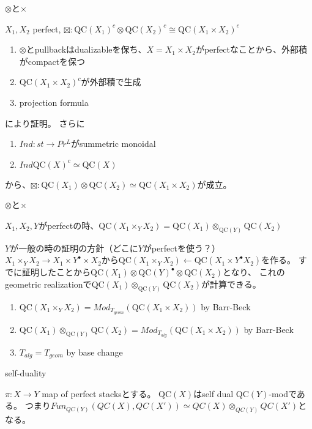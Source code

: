 \documentclass[dvipdfmx]{beamer}
\newcommand{\QC}{\mathrm{QC}}
\begin{document}
\begin{frame}{$\otimes$と$\times$}
\begin{prop}
$X_1, X_2$ perfect, $\boxtimes:\QC(X_1)^c\otimes \QC(X_2)^c \cong \QC(X_1\times X_2)^c$
\end{prop}
\begin{enumerate}
\item $\otimes$とpullbackはdualizableを保ち、$X=X_1\times X_2$がperfectなことから、外部積がcompactを保つ
\item $\QC(X_1\times X_2)^c$が外部積で生成
\item projection formula
\end{enumerate}
により証明。
さらに
\begin{enumerate}
\item $Ind:st \to Pr^L$がsummetric monoidal
\item $Ind\QC(X)^c\simeq \QC(X)$
\end{enumerate}
から、$\boxtimes:\QC(X_1)\otimes \QC(X_2) \simeq \QC(X_1\times X_2)$が成立。
\end{frame}

\begin{frame}{$\otimes$と$\times$}
\begin{thm}[BFNのTheorem 4.7]
$X_1, X_2, Y$がperfectの時、$\QC(X_1 \times_Y X_2) = \QC(X_1) \otimes_{\QC(Y)}\QC(X_2)$
\end{thm}

$Y$が一般の時の証明の方針（どこに$Y$がperfectを使う？）
$X_1\times_YX_2 \to X_1\times Y^\bullet\times X_2$から$\QC(X_1\times_YX_2) \gets \QC(X_1\times Y^\bullet X_2)$を作る。
すでに証明したことから$\QC(X_1)\otimes \QC(Y)^\bullet\otimes \QC(X_2)$となり、
これのgeometric realizationで$\QC(X_1)\otimes_{\QC(Y)}\QC(X_2)$が計算できる。
\begin{enumerate}
\item $\QC(X_1\times_YX_2)=Mod_{T_{geom}}(\QC(X_1\times X_2))$ by Barr-Beck
\item $\QC(X_1)\otimes_{\QC(Y)}\QC(X_2)=Mod_{T_{alg}}(\QC(X_1\times X_2))$ by Barr-Beck
\item $T_{alg}=T_{geom}$ by base change
\end{enumerate}
\end{frame}

\begin{frame}{self-duality}
\begin{cor}
$\pi:X \to Y$ map of perfect stacksとする。
$\QC(X)$はself dual $\QC(Y)$-modである。
つまり$Fun_{QC(Y)}(QC(X),QC(X')) \simeq QC(X)\otimes_{QC(Y)}QC(X')$となる。
\end{cor}

\end{frame}
\end{document}
